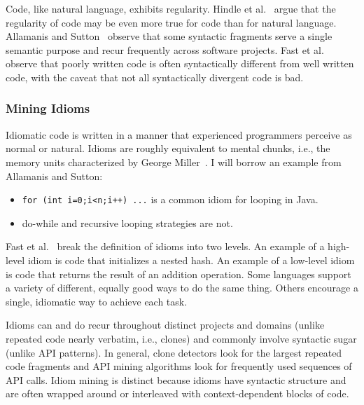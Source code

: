 Code, like natural language, exhibits regularity. Hindle et al.~\cite{Hindle2012} argue that the regularity of code may be even more true for code than for natural language. Allamanis and Sutton~\cite{allamanis2014mining} observe that some syntactic fragments serve a single semantic purpose and recur frequently across software projects. Fast et al.~\cite{codex} observe that poorly written code is often syntactically different from well written code, with the caveat that not all syntactically divergent code is bad.

\subsubsection{Mining Idioms}

Idiomatic code is written in a manner that experienced programmers perceive as normal or natural. Idioms are roughly equivalent to mental chunks, i.e., the memory units characterized by George Miller~\cite{chunking}. I will borrow an example from Allamanis and Sutton:~\cite{allamanis2014mining}

\begin{itemize}
\item \texttt{for (int i=0;i<n;i++) ...} is a common idiom for looping in Java.
\item do-while and recursive looping strategies are not.
\end{itemize}


Fast et al.~\cite{codex} break the definition of idioms into two levels. An example of a high-level idiom is code that initializes a nested hash. An example of a low-level idiom is code that returns the result of an addition operation. Some languages support a variety of different, equally good ways to do the same thing. Others encourage a single, idiomatic way to achieve each task.

Idioms can and do recur throughout distinct projects and domains (unlike repeated code nearly verbatim, i.e., clones) and commonly involve syntactic sugar (unlike API patterns). In general, clone detectors look for the largest repeated code fragments and API mining algorithms look for frequently used sequences of API calls. Idiom mining is distinct because idioms have syntactic structure and are often wrapped around or interleaved with context-dependent blocks of code.%

